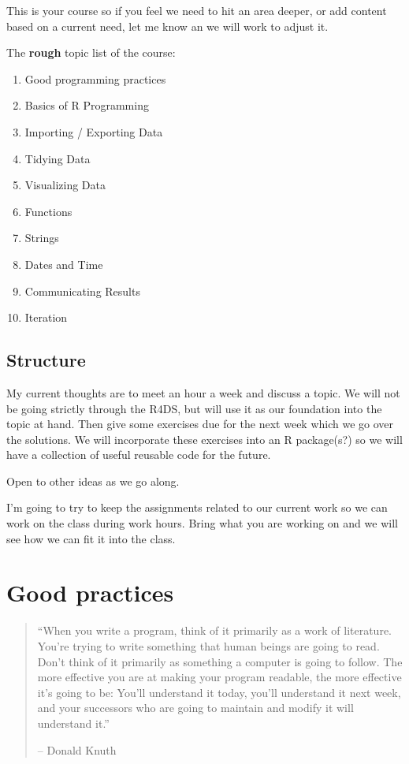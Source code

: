 \documentclass[]{book}
\providecommand{\tightlist}{%
  \setlength{\itemsep}{0pt}\setlength{\parskip}{0pt}}
\theoremstyle{definition}
\theoremstyle{definition}
\theoremstyle{definition}
\theoremstyle{remark}
\begin{document}
This is your course so if you feel we need to hit an area deeper, or add
content based on a current need, let me know an we will work to adjust
it.

The \textbf{rough} topic list of the course:

\begin{enumerate}
\def\labelenumi{\arabic{enumi}.}
\tightlist
\item
  Good programming practices
\item
  Basics of R Programming
\item
  Importing / Exporting Data
\item
  Tidying Data
\item
  Visualizing Data
\item
  Functions
\item
  Strings
\item
  Dates and Time
\item
  Communicating Results
\item
  Iteration
\end{enumerate}

\section{Structure}\label{structure}

My current thoughts are to meet an hour a week and discuss a topic. We
will not be going strictly through the R4DS, but will use it as our
foundation into the topic at hand. Then give some exercises due for the
next week which we go over the solutions. We will incorporate these
exercises into an R package(s?) so we will have a collection of useful
reusable code for the future.

Open to other ideas as we go along.

I'm going to try to keep the assignments related to our current work so
we can work on the class during work hours. Bring what you are working
on and we will see how we can fit it into the class.

\chapter{Good practices}\label{good-practices}

\begin{quote}
``When you write a program, think of it primarily as a work of
literature. You're trying to write something that human beings are going
to read. Don't think of it primarily as something a computer is going to
follow. The more effective you are at making your program readable, the
more effective it's going to be: You'll understand it today, you'll
understand it next week, and your successors who are going to maintain
and modify it will understand it.''

-- Donald Knuth
\end{quote}
\end{document}

